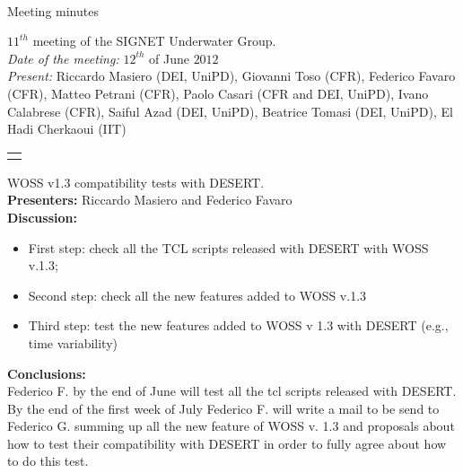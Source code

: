 \documentclass[11pt,journal,draftclsnofoot,onecolumn,twoside,letterpaper]{IEEEtran}
\theoremstyle{definition} \newtheorem{definition}[]{Definition}
\theoremstyle{theorem} \newtheorem{theorem}[]{Theorem}
\begin{document}
\pagestyle{empty}

\begin{Large} \\ \end{Large}
\begin{large} {Meeting minutes} \end{large}

\vspace{0.8cm}

 $11^{th}$ meeting of the SIGNET Underwater Group.\\
{\it Date of the meeting: } $12^{th}$ of June $2012$\\
{\it Present: } Riccardo Masiero (DEI, UniPD), Giovanni Toso (CFR), Federico Favaro (CFR), Matteo Petrani (CFR), Paolo Casari (CFR and DEI, UniPD), Ivano Calabrese (CFR), Saiful Azad (DEI, UniPD), Beatrice Tomasi (DEI, UniPD),  El Hadi Cherkaoui (IIT)\\

\vspace{0.5cm}

\begin{tabular}{p{}}
 \hline \\
\end{tabular}


 WOSS v1.3 compatibility tests with DESERT.\\
{\bf Presenters:} Riccardo Masiero and Federico Favaro\\

{\bf Discussion:}\\

\begin{itemize}
\item First step: check all the TCL scripts released with DESERT with WOSS v.1.3;
\item Second step: check all the new features added to WOSS v.1.3
\item Third step: test the new features added to WOSS v 1.3 with DESERT (e.g., time variability)
\end{itemize}

{\bf Conclusions:}\\
Federico F. by the end of June will test all the tcl scripts released with DESERT. By the end of the first week of July Federico F. will write a mail to be send to Federico G. summing up all the new feature of WOSS v. 1.3 and proposals about how to test their compatibility with DESERT in order to fully agree about how to do this test.
\end{document}
